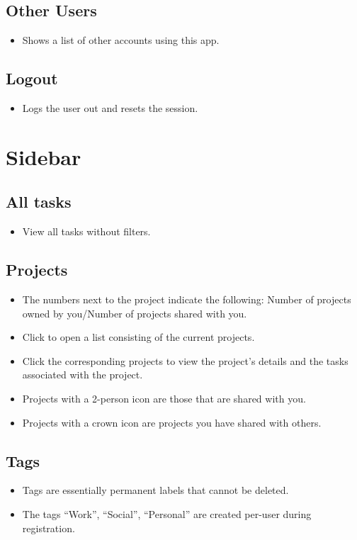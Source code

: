 \documentclass{article}
\begin{document}
\subsection{Other Users}
\begin{itemize}
  \item Shows a list of other accounts using this app.
\end{itemize}


\subsection{Logout}
\begin{itemize}
  \item Logs the user out and resets the session.
\end{itemize}

\section{Sidebar}
\subsection{All tasks}
\begin{itemize}
  \item View all tasks without filters.
\end{itemize}


\subsection{Projects}
\begin{itemize}
  \item The numbers next to the project indicate the following: Number of projects owned by you/Number of projects shared with you.
  \item Click to open a list consisting of the current projects.
  \item Click the corresponding projects to view the project’s details and the tasks associated with the project.
  \item Projects with a 2-person icon are those that are shared with you.
  \item Projects with a crown icon are projects you have shared with others.
\end{itemize}



\subsection{Tags}
\begin{itemize}
  \item Tags are essentially permanent labels that cannot be deleted.
  \item The tags “Work”, “Social”, “Personal” are created per-user during registration.
\end{itemize}
\end{document}
